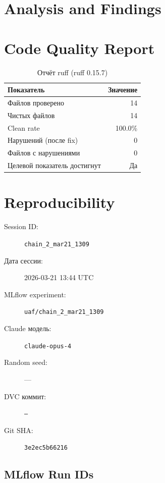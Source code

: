 \documentclass[12pt,a4paper]{article}
\begin{document}
\section{Analysis and Findings}









\section{Code Quality Report}

\begin{table}[H]
\centering
\caption{Отчёт ruff (ruff 0.15.7)}
\begin{tabular}{lr}
\toprule
Показатель & Значение \\
\midrule
Файлов проверено & 14 \\
Чистых файлов & 14 \\
Clean rate & \textcolor{passcolor}{100.0\%} \\
Нарушений (после fix) & \textcolor{passcolor}{0} \\
Файлов с нарушениями & 0 \\
Целевой показатель достигнут & \textcolor{passcolor}{Да} \\
\bottomrule
\end{tabular}
\end{table}





\section{Reproducibility}

\begin{description}
    \item[Session ID:] \texttt{chain\_2\_mar21\_1309}
    \item[Дата сессии:] 2026-03-21 13:44 UTC
    \item[MLflow experiment:] \texttt{uaf/chain\_2\_mar21\_1309}
    \item[Claude модель:] \texttt{claude-opus-4}
    \item[Random seed:] ---
    \item[DVC коммит:] \texttt{---}
    \item[Git SHA:] \texttt{3e2ec5b66216}
\end{description}

\subsection*{MLflow Run IDs}
\end{document}
